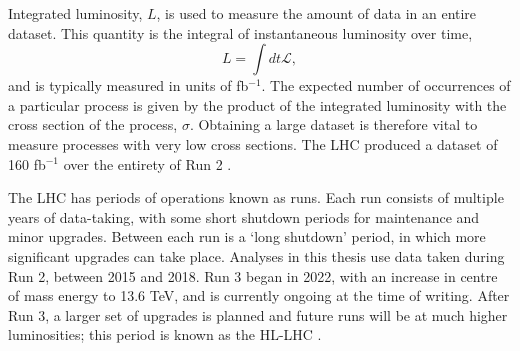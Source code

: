Integrated luminosity, $L$, is used to measure the amount of data in an entire
dataset. This quantity is the integral of instantaneous luminosity over time,
\begin{equation*}
  L = \int dt \mathcal{L},
\end{equation*}
and is typically measured in units of fb$^{-1}$.
The expected number of occurrences of a particular process is given by the
product of the integrated luminosity with the cross section of the process,
$\sigma$. Obtaining a large dataset is therefore vital to measure processes with
very low cross sections. The \ac{LHC} produced a dataset of 160 fb$^{-1}$ over
the entirety of Run 2 \cite{Steerenberg2019}.

The \ac{LHC} has periods of operations known as runs. Each run consists of
multiple years of data-taking, with some short shutdown periods for maintenance
and minor upgrades. Between each run is a `long shutdown' period, in which more
significant upgrades can take place. Analyses in this thesis use data taken
during Run 2, between 2015 and 2018. Run 3 began in 2022, with an increase in
centre of mass energy to 13.6 TeV, and is currently ongoing at the time of
writing. After Run 3, a larger set of upgrades is planned and future runs will
be at much higher luminosities; this period is known as the \ac{HL-LHC}
\cite{Aberle2020}.
